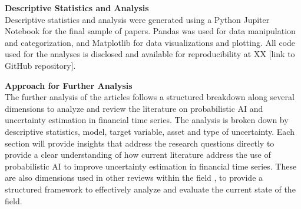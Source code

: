 \textbf{Descriptive Statistics and Analysis}\\
Descriptive statistics and analysis were generated using a Python Jupiter Notebook for the final sample of papers. Pandas was used for data manipulation and categorization, and Matplotlib for data visualizations and plotting. All code used for the analyses is disclosed and available for reproducibility at XX [link to GitHub repository]. 

\textbf{Approach for Further Analysis}\\
The further analysis of the articles follows a structured breakdown along several dimensions to analyze and review the literature on probabilistic AI and uncertainty estimation in financial time series. The analysis is broken down by descriptive statistics, model, target variable, asset and type of uncertainty. Each section will provide insights that address the research questions directly to provide a clear understanding of how current literature address the use of probabilistic AI to improve uncertainty estimation in financial time series. These are also dimensions used in other reviews within the field \parencite{Blasco_et_al_2024}, to provide a structured framework to effectively analyze and evaluate the current state of the field. 

